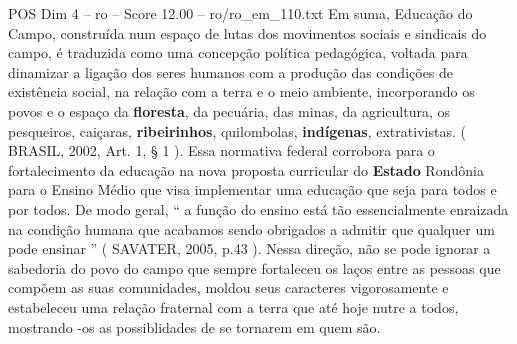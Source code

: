 \begin{textsample}{POS Dim 4 – ro – Score 12.00 – ro/ro\_em\_110.txt}
Em suma, Educação do Campo, construída num espaço de lutas dos movimentos sociais e sindicais do campo, é traduzida como uma concepção política pedagógica, voltada para dinamizar a ligação dos seres humanos com a produção das condições de existência social, na relação com a terra e o meio ambiente, incorporando os povos e o espaço da \textbf{floresta}, da pecuária, das minas, da agricultura, os pesqueiros, caiçaras, \textbf{ribeirinhos}, quilombolas, \textbf{indígenas}, extrativistas. ( BRASIL, 2002, Art. 1, § 1 ).
Essa normativa federal corrobora para o fortalecimento da educação na nova proposta curricular do \textbf{Estado} Rondônia para o Ensino Médio que visa implementar uma educação que seja para todos e por todos.
De modo geral, “ a função do ensino está tão essencialmente enraizada na condição humana que acabamos sendo obrigados a admitir que qualquer um pode ensinar ” ( SAVATER, 2005, p.43 ).
Nessa direção, não se pode ignorar a sabedoria do povo do campo que sempre fortaleceu os laços entre as pessoas que compõem as suas comunidades, moldou seus caracteres vigorosamente e estabeleceu uma relação fraternal com a terra que até hoje nutre a todos, mostrando -os as possiblidades de se tornarem em quem são.

\end{textsample}
